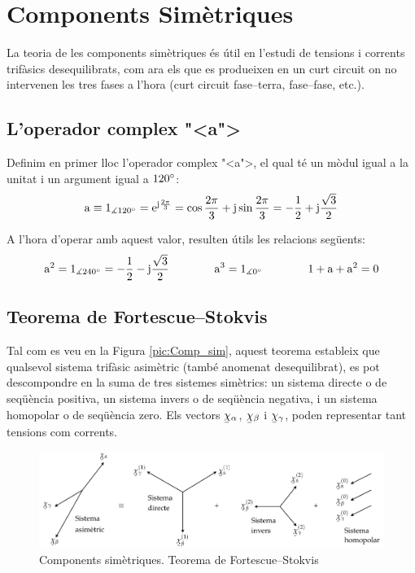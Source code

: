 \chapter{Components Sim\`{e}triques} 

La teoria de les components sim\`{e}triques \'{e}s \'{u}til en l'estudi de
tensions i corrents trif\`{a}sics
 desequilibrats, com ara els que es produeixen en un curt circuit on no intervenen les tres
 fases a l'hora (curt circuit fase--terra, fase--fase, etc.).

\section{L'operador complex {"<}a{">}}

Definim en primer lloc l'operador complex {"<}a{">}, el qual t\'{e} un m\`{o}dul
igual a la unitat i un argument igual a $120^\circ$: 
\begin{equation}
   \mathrm{a} \equiv 1_{\measuredangle 120^\circ} = \mathrm{e}^{\mathrm{j}\frac{2\pi}{3}} =
   \cos \frac{2\pi}{3} + \mathrm{j} \sin \frac{2\pi}{3} = - \frac{1}{2} + \mathrm{j} \frac{\sqrt{3}}{2}
\end{equation}

A l'hora d'operar amb aquest valor, resulten \'{u}tils les relacions
seg\"{u}ents:
\begin{equation}
   \mathrm{a}^2 = 1_{\measuredangle 240^\circ}= - \frac{1}{2} - \mathrm{j} \frac{\sqrt{3}}{2}\qquad\qquad
   \mathrm{a}^3 = 1_{\measuredangle 0^\circ} \qquad\qquad
   1+ \mathrm{a} + \mathrm{a}^2 = 0
\end{equation}

\section{\texorpdfstring{Teorema de Fortescue--Stokvis}{Teorema de Fortescue-Stokvis}}

Tal com es veu en la Figura \vref{pic:Comp_sim}, aquest teorema
estableix que qualsevol sistema trif\`{a}sic asim\`{e}tric (tamb\'{e} anomenat
desequilibrat),  es pot descompondre  en la suma de tres sistemes
sim\`{e}trics: un sistema directe o de seq\"{u}\`{e}ncia positiva, un sistema
invers o de seq\"{u}\`{e}ncia negativa, i un sistema homopolar o de
seq\"{u}\`{e}ncia zero. Els vectors $\cmplx{\chi}_\alpha$,
$\cmplx{\chi}_\beta$ i $\cmplx{\chi}_\gamma$, poden representar tant
tensions com corrents.
\begin{figure}[h]
\centering
    \includegraphics{Imatges/Cap-CompSim-CompSim.pdf}
\caption{Components sim\`{e}triques. Teorema de Fortescue--Stokvis}
\label{pic:Comp_sim}
\end{figure}

